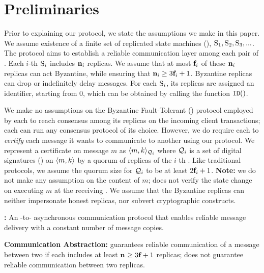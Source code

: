 \section{Preliminaries}
Prior to explaining our \Scrooge{} protocol, we state the assumptions we make 
in this paper.
We assume existence of a finite set of replicated state machines (\RSM{}), 
$\textsc{S}_{1}, \textsc{S}_{2}, \textsc{S}_{3}, ...$.
The \Scrooge{} protocol aims to establish a reliable communication layer among each pair 
of .
Each $i$-th \RSM{} $\textsc{S}_{i}$ includes $\textbf{n}_{i}$ replicas. 
We assume that at most $\textbf{f}_{i}$ of these $\textbf{n}_{i}$ replicas can act Byzantine, while ensuring 
that $\textbf{n}_{i} \ge 3\textbf{f}_{i} + 1$.
Byzantine replicas can drop or indefinitely delay messages.
For each \RSM{} $\textsc{S}_{i}$, its replicas are assigned an identifier, starting from $0$, 
which can be obtained by calling the function $\texttt{ID}({})$.


We make no assumptions on the Byzantine Fault-Tolerant (\BFT{}) protocol employed by each \RSM{} 
to reach consensus among its replicas on the incoming client transactions; 
each \RSM{} can run any \BFT{} consensus protocol of its choice.
However, we do require each \RSM{} to {\em certify} each message it wants to communicate 
to another \RSM{} using our \Scrooge{} protocol.
We represent a certificate on message $m$ as $\langle m, k\rangle_{\mathcal{Q}_{i}}$ where
$\mathcal{Q}_{i}$ is a set of digital signatures (\DS{}) on $\langle m, k \rangle$ by a quorum of replicas 
of the $i$-th \RSM{}.
Like traditional \BFT{} protocols, we assume the quorum size for $\mathcal{Q}_{i}$ to be at least $2\textbf{f}_{i}+1$.
{\bf Note:} we do not make any assumption on the content of $m$; 
\Scrooge{} does not verify the state change on executing $m$ at the receiving \RSM{}.
We assume that the Byzantine replicas can neither impersonate honest replicas, nor subvert cryptographic constructs.


\begin{definition}\label{def:scrooge}
{\bf \Scrooge{}:}
An \RSM{}-to-\RSM{} asynchronous communication protocol that enables reliable message delivery with a constant 
number of message copies.
\end{definition}

\begin{definition}
{\bf Communication Abstraction:}
\Scrooge{} guarantees reliable communication of a message between two  if each \RSM{} includes at least $\textbf{n}_{} \ge 3\textbf{f}_{}+1$ 
replicas;
\Scrooge{} does not guarantee reliable communication between two replicas.
\end{definition}


